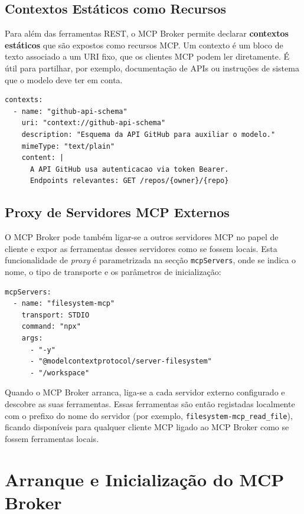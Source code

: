 \subsection{Contextos Estáticos como Recursos}

Para além das ferramentas REST, o MCP Broker permite declarar \textbf{contextos estáticos} que são expostos como recursos MCP. Um contexto é um bloco de texto associado a um URI fixo, que os clientes MCP podem ler diretamente. É útil para partilhar, por exemplo, documentação de APIs ou instruções de sistema que o modelo deve ter em conta.

\begin{lstlisting}[caption={Exemplo de contexto estático exposto como recurso MCP.}]
contexts:
  - name: "github-api-schema"
    uri: "context://github-api-schema"
    description: "Esquema da API GitHub para auxiliar o modelo."
    mimeType: "text/plain"
    content: |
      A API GitHub usa autenticacao via token Bearer.
      Endpoints relevantes: GET /repos/{owner}/{repo}
\end{lstlisting}

\subsection{Proxy de Servidores MCP Externos}

O MCP Broker pode também ligar-se a outros servidores MCP no papel de cliente e expor as ferramentas desses servidores como se fossem locais. Esta funcionalidade de \textit{proxy} é parametrizada na secção \texttt{mcpServers}, onde se indica o nome, o tipo de transporte e os parâmetros de inicialização:

\begin{lstlisting}[caption={Exemplo de configuração de proxy para um servidor MCP externo.}]
mcpServers:
  - name: "filesystem-mcp"
    transport: STDIO
    command: "npx"
    args:
      - "-y"
      - "@modelcontextprotocol/server-filesystem"
      - "/workspace"
\end{lstlisting}

Quando o MCP Broker arranca, liga-se a cada servidor externo configurado e descobre as suas ferramentas. Essas ferramentas são então registadas localmente com o prefixo do nome do servidor (por exemplo, \texttt{filesystem-mcp\_read\_file}), ficando disponíveis para qualquer cliente MCP ligado ao MCP Broker como se fossem ferramentas locais.


\section{Arranque e Inicialização do MCP Broker}

